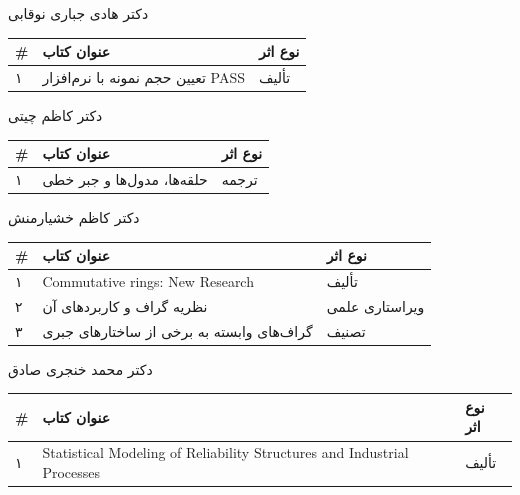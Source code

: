\documentclass[
  letterpaper,
  DIV=11,
  numbers=noendperiod]{scrreprt}
\newcounter{none} %
\begin{document}
دکتر هادی جباری نوقابی

{\def\LTcaptype{none} %
\begin{longtable}[]{@{}lll@{}}
\toprule\noalign{}
\# & عنوان کتاب & نوع اثر \\
\midrule\noalign{}
\endhead
\bottomrule\noalign{}
\endlastfoot
۱ & تعیین حجم نمونه با نرم‌افزار PASS & تألیف \\
\end{longtable}
}

دکتر کاظم چیتی

{\def\LTcaptype{none} %
\begin{longtable}[]{@{}lll@{}}
\toprule\noalign{}
\# & عنوان کتاب & نوع اثر \\
\midrule\noalign{}
\endhead
\bottomrule\noalign{}
\endlastfoot
۱ & حلقه‌ها، مدول‌ها و جبر خطی & ترجمه \\
\end{longtable}
}

دکتر کاظم خشیارمنش

{\def\LTcaptype{none} %
\begin{longtable}[]{@{}lll@{}}
\toprule\noalign{}
\# & عنوان کتاب & نوع اثر \\
\midrule\noalign{}
\endhead
\bottomrule\noalign{}
\endlastfoot
۱ & Commutative rings: New Research & تألیف \\
۲ & نظریه گراف و کاربردهای آن & ویراستاری علمی \\
۳ & گراف‌های وابسته به برخی از ساختارهای جبری & تصنیف \\
\end{longtable}
}

دکتر محمد خنجری صادق

{\def\LTcaptype{none} %
\begin{longtable}[]{@{}
  >{\raggedright\arraybackslash}p{}
  >{\raggedright\arraybackslash}p{}
  >{\raggedright\arraybackslash}p{}@{}}
\toprule\noalign{}
\begin{minipage}[b]{\linewidth}\raggedright
\#
\end{minipage} & \begin{minipage}[b]{\linewidth}\raggedright
عنوان کتاب
\end{minipage} & \begin{minipage}[b]{\linewidth}\raggedright
نوع اثر
\end{minipage} \\
\midrule\noalign{}
\endhead
\bottomrule\noalign{}
\endlastfoot
۱ & Statistical Modeling of Reliability Structures and Industrial
Processes & تألیف \\
\end{longtable}
}
\end{document}
